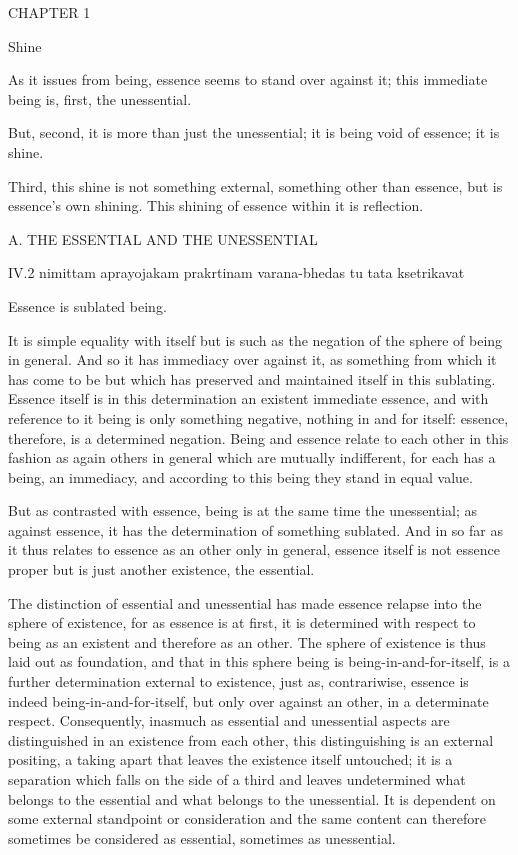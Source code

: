 CHAPTER 1

Shine

As it issues from being, essence seems to stand over against it;
this immediate being is, first, the unessential.

But, second, it is more than just the unessential;
it is being void of essence; it is shine.

Third, this shine is not something external,
something other than essence, but is essence's own shining.
This shining of essence within it is reflection.

A. THE ESSENTIAL AND THE UNESSENTIAL

IV.2
nimittam aprayojakam prakrtinam varana-bhedas tu tata ksetrikavat

Essence is sublated being.

It is simple equality with itself
but is such as the negation of the sphere of being in general.
And so it has immediacy over against it,
as something from which it has come to be but which has
preserved and maintained itself in this sublating.
Essence itself is in this determination
an existent immediate essence,
and with reference to it
being is only something negative,
nothing in and for itself:
essence, therefore, is a determined negation.
Being and essence relate to each other in this fashion
as again others in general which are mutually indifferent,
for each has a being, an immediacy,
and according to this being they stand in equal value.

But as contrasted with essence,
being is at the same time the unessential;
as against essence, it has the determination of something sublated.
And in so far as it thus relates to essence
as an other only in general,
essence itself is not essence proper
but is just another existence, the essential.

The distinction of essential and unessential has
made essence relapse into the sphere of existence,
for as essence is at first,
it is determined with respect to being
as an existent and therefore as an other.
The sphere of existence is thus laid out as foundation,
and that in this sphere being is being-in-and-for-itself,
is a further determination external to existence,
just as, contrariwise, essence is indeed being-in-and-for-itself,
but only over against an other, in a determinate respect.
Consequently, inasmuch as essential and unessential aspects are
distinguished in an existence from each other,
this distinguishing is an external positing,
a taking apart that leaves the existence itself untouched;
it is a separation which falls on the side of
a third and leaves undetermined what belongs to the essential
and what belongs to the unessential.
It is dependent on some external standpoint or consideration
and the same content can therefore sometimes be considered
as essential, sometimes as unessential.

